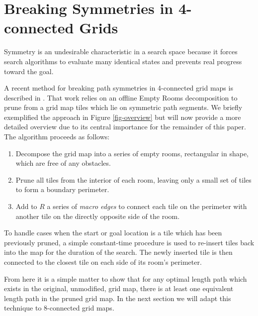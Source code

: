 \section{Breaking Symmetries in 4-connected Grids}
Symmetry is an undesirable characteristic in a search space because it forces
search algorithms to evaluate many identical states and prevents real progress toward the goal.
\par
A recent method for breaking path symmetries in 4-connected grid maps is described in \cite{harabor10}.
That work relies on an offline Empty Rooms decomposition to prune from a grid map tiles which lie on 
symmetric path segments.
We briefly exemplified the approach in Figure \ref{fig-overview} but will now provide a more detailed overview
due to its central importance for the remainder of this paper.
The algorithm proceeds as follows:
\begin{enumerate}
\item{Decompose the grid map into a series of empty rooms, rectangular in shape, which are free of any obstacles.}
\item{Prune all tiles from the interior of each room, leaving only a small set of tiles to form a boundary perimeter.} 
\item{Add to $R$ a series of \emph{macro edges} to connect each tile on the perimeter with another tile on the directly opposite side
of the room. }
\end{enumerate}
To handle cases when the start or goal location is a tile which has been previously pruned, a simple constant-time
procedure is used to re-insert tiles back into the map for the duration of the search.
The newly inserted tile is then connected to the closest tile on each side of its room's perimeter.

From here it is a simple matter to show that for any optimal length path which exists in the original, unmodified, grid
map, there is at least one equivalent length path in the pruned grid map. 
In the next section we will adapt this technique to 8-connected grid maps. 
